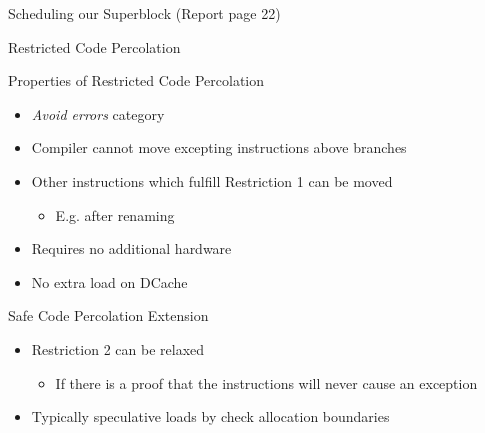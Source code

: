 \documentclass[presentation]{beamer}
\begin{document}
\begin{frame}{Scheduling our Superblock (Report page 22)}
    \begin{center}
    \begin{minipage}{1\textwidth}
        \begin{center}
                \resizebox{0.57\textwidth}{!}{
                    \begin{minipage}{\textwidth}
                        
                    \end{minipage}
                }
        
        \vspace{-0.2cm}
        \captionsetup{type=Listing}
        \end{center}
        \end{minipage}
    \end{center}
\end{frame}

\begin{frame}{Restricted Code Percolation}
    \begin{block}{Properties of Restricted Code Percolation}
        \begin{itemize}
            \item \textit{Avoid errors} category~\cite{bringmannMH95}
            \item Compiler cannot move excepting instructions above branches
            \item Other instructions which fulfill Restriction 1 can be moved
                \begin{itemize}
                    \item E.g. after renaming
                \end{itemize}
            \item Requires no additional hardware
            \item No extra load on DCache
        \end{itemize}
    \end{block}
    \begin{block}{Safe Code Percolation Extension~\cite{bringmannMH95}}
        \begin{itemize}
            \item Restriction 2 can be relaxed 
            \begin{itemize}
                \item If there is a proof that the instructions will never cause an exception
            \end{itemize}     
            \item Typically speculative loads by check allocation boundaries
        \end{itemize}
    \end{block}
\end{frame}
\end{document}
